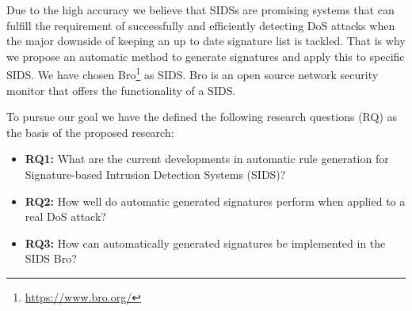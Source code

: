 Due to the high accuracy we believe that SIDSs are promising systems that can fulfill the requirement of successfully and efficiently detecting DoS attacks when the major downside of keeping an up to date signature list is tackled. That is why we propose an automatic method to generate signatures and apply this to specific SIDS. We have chosen Bro\footnote{\url{https://www.bro.org/}} as SIDS. Bro is an open source network security monitor that offers the functionality of a SIDS. 



To pursue our goal we have the defined the following research questions (RQ) as the basis of the proposed research:





\begin{itemize}	
	\item \textbf{RQ1:} What are the current developments in automatic rule generation for Signature-based Intrusion Detection Systems (SIDS)?
	\item \textbf{RQ2:} How well do automatic generated signatures perform when applied to a real DoS attack?
	 \item \textbf{RQ3:} How can automatically generated signatures be implemented in the SIDS Bro?
\end{itemize}







